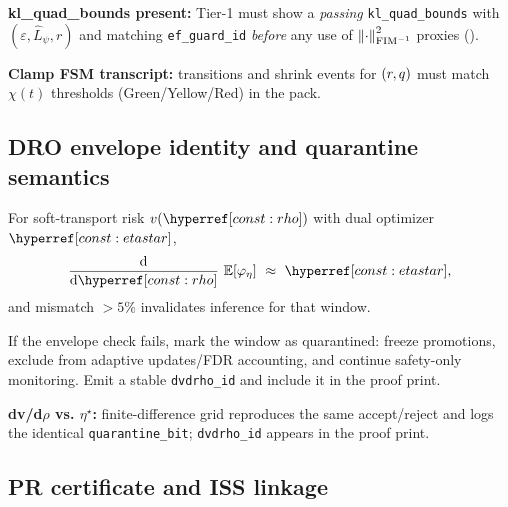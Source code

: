 \begin{acceptchecks}
\item \textbf{kl\_quad\_bounds present:} Tier-1 must show a \emph{passing} \texttt{kl\_quad\_bounds} with $(\varepsilon,\hat L_\psi,r)$ and matching \texttt{ef\_guard\_id} \emph{before} any use of $\left\|\cdot\right\|_{\mathrm{FIM}^{-1}}^2$ proxies (\jsgiiThm{\lblEFradius}).
\item \textbf{Clamp FSM transcript:} transitions and shrink events for $(r,q)$ must match $\chi(t)$ thresholds (Green/Yellow/Red) in the pack.
\end{acceptchecks}

\subsection{DRO envelope identity and quarantine semantics}\label{subsec:dro-envelope}
\emph{}

\begin{proposition}\label{prop:kkt}
For soft-transport risk $v(\constref{rho})$ with dual optimizer $\constref{etastar}$,
\[
\frac{\mathrm d}{\mathrm d\constref{rho}}\ \mathbb E[\varphi_{\eta}]\ \approx\ \constref{etastar},
\]
and mismatch $>5\%$ invalidates inference for that window.
\end{proposition}

\begin{definition}\label{def:window-quarantine-impl}
If the envelope check fails, mark the window as quarantined: freeze promotions, exclude from adaptive updates/FDR accounting, and continue safety-only monitoring. Emit a stable \texttt{dvdrho\_id} and include it in the proof print.
\end{definition}

\begin{acceptchecks}
\item \textbf{dv/d$\rho$ vs. $\eta^\star$:} finite-difference grid reproduces the same accept/reject and logs the identical \texttt{quarantine\_bit}; \texttt{dvdrho\_id} appears in the proof print.
\end{acceptchecks}

\subsection{PR certificate and ISS linkage}\label{subsec:pr-iss}
\emph{}

